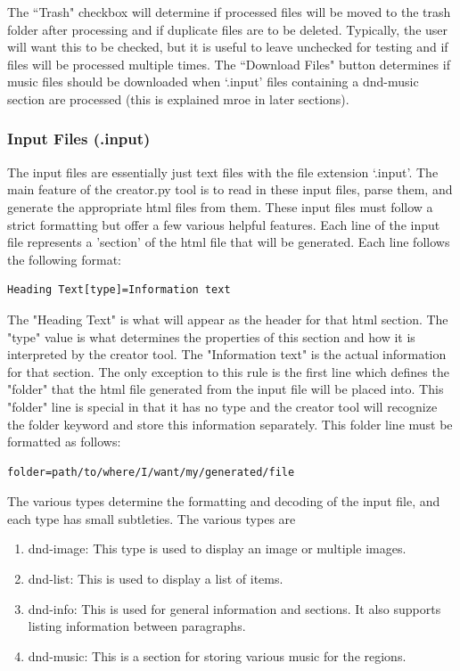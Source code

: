 The ``Trash" checkbox will determine if processed files will be moved to the trash folder after processing and if duplicate files are to be deleted. Typically, the user will want this to be checked, but it is useful to leave unchecked for testing and if files will be processed multiple times. The ``Download Files" button determines if music files should be downloaded when `.input' files containing a dnd-music section are processed (this is explained mroe in later sections).

\subsubsection{Input Files (.input)}

The input files are essentially just text files with the file extension `.input'. The main feature of the creator.py tool is to read in these input files, parse them, and generate the appropriate html files from them. These input files must follow a strict formatting but offer a few various helpful features. Each line of the input file represents a 'section' of the html file that will be generated. Each line follows the following format:
\begin{lstlisting}
Heading Text[type]=Information text
\end{lstlisting}
The "Heading Text" is what will appear as the header for that html section. The "type" value is what determines the properties of this section and how it is interpreted by the creator tool. The "Information text" is the actual information for that section. The only exception to this rule is the first line which defines the "folder" that the html file generated from the input file will be placed into. This "folder" line is special in that it has no type and the creator tool will recognize the folder keyword and store this information separately. This folder line must be formatted as follows:
\begin{lstlisting}
folder=path/to/where/I/want/my/generated/file
\end{lstlisting}
The various types determine the formatting and decoding of the input file, and each type has small subtleties. The various types are
\begin{enumerate}
	\item dnd-image: This type is used to display an image or multiple images.
 	\item dnd-list: This is used to display a list of items.
 	\item dnd-info: This is used for general information and sections. It also supports listing information between paragraphs.
  	\item dnd-music: This is a section for storing various music for the regions.
\end{enumerate}

